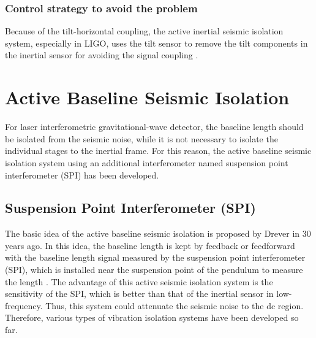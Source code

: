 \subsubsection{Control strategy to avoid the problem}
Because of the tilt-horizontal coupling, the active inertial seismic isolation system, especially in LIGO, uses the tilt sensor to remove the tilt components in the inertial sensor for avoiding the signal coupling \cite{biscans2018optimization}.


\section{Active Baseline Seismic Isolation} \label{sec:53}
For laser interferometric gravitational-wave detector, the baseline length should be isolated from the seismic noise, while it is not necessary to isolate the individual stages to the inertial frame. For this reason, the active baseline seismic isolation system using an additional interferometer named suspension point interferometer (SPI) has been developed.





\subsection{Suspension Point Interferometer (SPI)} \label{sec:321}
The basic idea of the active baseline seismic isolation is proposed by Drever in 30 years ago. In this idea, the baseline length is kept by feedback or feedforward with the baseline length signal measured by the suspension point interferometer (SPI), which is installed near the suspension point of the pendulum to measure the length \cite{drever1987outline}. The advantage of this active seismic isolation system is the sensitivity of the SPI, which is better than that of the inertial sensor in low-frequency. Thus, this system could attenuate the seismic noise to the dc region. Therefore, various types of vibration isolation systems have been developed so far.

